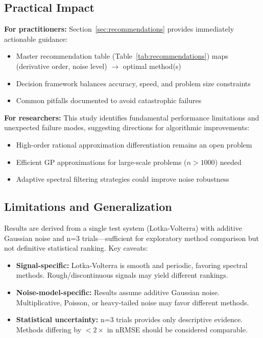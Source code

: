 \subsection{Practical Impact}

\textbf{For practitioners:} Section~\ref{sec:recommendations} provides immediately actionable guidance:
\begin{itemize}
    \item Master recommendation table (Table~\ref{tab:recommendations}) maps (derivative order, noise level) $\to$ optimal method(s)
    \item Decision framework balances accuracy, speed, and problem size constraints
    \item Common pitfalls documented to avoid catastrophic failures
\end{itemize}

\textbf{For researchers:} This study identifies fundamental performance limitations and unexpected failure modes, suggesting directions for algorithmic improvements:
\begin{itemize}
    \item High-order rational approximation differentiation remains an open problem
    \item Efficient GP approximations for large-scale problems ($n > 1000$) needed
    \item Adaptive spectral filtering strategies could improve noise robustness
\end{itemize}

\subsection{Limitations and Generalization}

Results are derived from a single test system (Lotka-Volterra) with additive Gaussian noise and n=3 trials—sufficient for exploratory method comparison but not definitive statistical ranking. Key caveats:

\begin{itemize}
    \item \textbf{Signal-specific:} Lotka-Volterra is smooth and periodic, favoring spectral methods. Rough/discontinuous signals may yield different rankings.
    \item \textbf{Noise-model-specific:} Results assume additive Gaussian noise. Multiplicative, Poisson, or heavy-tailed noise may favor different methods.
    \item \textbf{Statistical uncertainty:} n=3 trials provides only descriptive evidence. Methods differing by $<2\times$ in nRMSE should be considered comparable.
\end{itemize}

